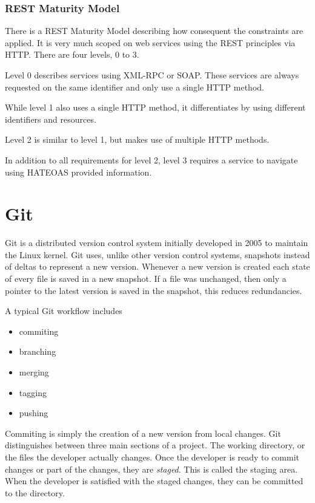 \subsubsection{REST Maturity Model}

There is a REST Maturity Model describing how consequent the constraints are
applied. It is very much scoped on web services using the REST principles via
HTTP. There are four levels, 0 to 3.

Level 0 describes services using XML-RPC or SOAP. These services are always
requested on the same identifier and only use a single HTTP method.

While level 1 also uses a single HTTP method, it differentiates by using
different identifiers and resources.

Level 2 is similar to level 1, but makes use of multiple HTTP methods.

In addition to all requirements for level 2, level 3 requires a service to
navigate using HATEOAS provided information.

\section{Git}

Git is a distributed version control system initially developed in 2005 to
maintain the Linux kernel. Git uses, unlike other version control systems,
snapshots instead of deltas to represent a new version. Whenever a new version
is created each state of every file is saved in a new snapshot. If a file was
unchanged, then only a pointer to the latest version is saved in the snapshot,
this reduces redundancies.

A typical Git workflow includes

\begin{itemize}
  \item{commiting}
  \item{branching}
  \item{merging}
  \item{tagging}
  \item{pushing}
\end{itemize}

Commiting is simply the creation of a new version from local changes. Git
distinguishes between three main sections of a project. The working directory,
or the files the developer actually changes. Once the developer is ready to
commit changes or part of the changes, they are \textit{staged}. This is called
the staging area. When the developer is satisfied with the staged changes,
they can be committed to the directory.

